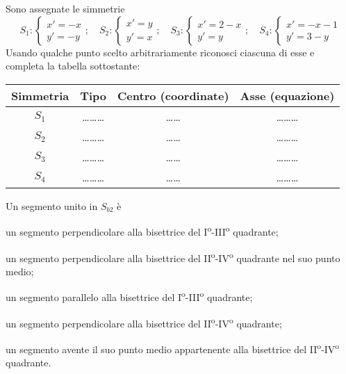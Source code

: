\begin{esercizio}
  \label{ese:8.39} %
  Sono assegnate le simmetrie
  \[S_1:\begin{cases}x'=-x\\y'=-y\end{cases};\quad 
  S_2:\begin{cases}x'=y\\y'=x\end{cases};\quad
  S_3:\begin{cases}x'=2-x\\y'=y\end{cases};\quad 
  S_4:\begin{cases}x'=-x-1\\y'=3-y\end{cases}\]
  Usando qualche punto scelto arbitrariamente riconosci ciascuna di 
  esse e completa la tabella sottostante:
  \begin{center}
    \begin{tabular}{cccc}
      \toprule
      Simmetria & Tipo & Centro (coordinate) & Asse (equazione)\\
      \midrule
      \(S_1\) & \ldots\ldots\ldots{} & \ldots\ldots{} & \ldots\ldots\ldots{} 
      \\
      \(S_2\) & \ldots\ldots\ldots{} & \ldots\ldots{} & \ldots\ldots\ldots{} 
      \\
      \(S_3\) & \ldots\ldots\ldots{} & \ldots\ldots{} & \ldots\ldots\ldots{} 
      \\
      \(S_4\) & \ldots\ldots\ldots{} & \ldots\ldots{} & \ldots\ldots\ldots{} 
      \\
      \bottomrule
    \end{tabular}
  \end{center}
\end{esercizio}

\begin{esercizio}
  \label{ese:8.43} %
  Un segmento unito in \(S_{b2}\) è
  \begin{enumeratea}
    \item un segmento perpendicolare alla bisettrice del 
    I\textsuperscript{o}-III\textsuperscript{o} quadrante;
    \item un segmento perpendicolare alla bisettrice del 
    II\textsuperscript{o}-IV\textsuperscript{o} quadrante nel suo punto 
    medio;
    \item un segmento parallelo alla bisettrice del 
    I\textsuperscript{o}-III\textsuperscript{o} quadrante;
    \item un segmento perpendicolare alla bisettrice del 
    II\textsuperscript{o}-IV\textsuperscript{o} quadrante;
    \item un segmento avente il suo punto medio appartenente alla 
    bisettrice del II\textsuperscript{o}-IV\textsuperscript{o} quadrante.
  \end{enumeratea}
\end{esercizio}

